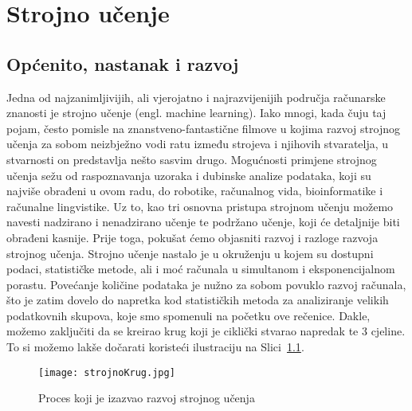 \documentclass[times, utf8, zavrsni, numeric]{fer}
\begin{document}
\chapter{Strojno učenje}
\section{Općenito, nastanak i razvoj}
Jedna od najzanimljivijih, ali vjerojatno i najrazvijenijih područja računarske znanosti je strojno učenje (engl. machine learning). Iako mnogi, kada čuju taj pojam, često pomisle na znanstveno-fantastične filmove u kojima razvoj strojnog učenja za sobom neizbježno vodi ratu između strojeva i njihovih stvaratelja, u stvarnosti on predstavlja nešto sasvim drugo. Mogućnosti primjene strojnog učenja sežu od raspoznavanja uzoraka i dubinske analize podataka, koji su najviše obrađeni u ovom radu, do robotike, računalnog vida, bioinformatike i računalne lingvistike. Uz to, kao tri osnovna pristupa strojnom učenju možemo navesti nadzirano i nenadzirano učenje te podržano učenje, koji će detaljnije biti obrađeni kasnije. Prije toga, pokušat ćemo objasniti razvoj i razloge razvoja strojnog učenja. Strojno učenje nastalo je u okruženju u kojem su dostupni podaci, statističke metode, ali i moć računala u simultanom i eksponencijalnom porastu. Povećanje količine podataka je nužno za sobom povuklo razvoj računala, što je zatim dovelo do napretka kod statističkih metoda za analiziranje velikih podatkovnih skupova, koje smo spomenuli na početku ove rečenice. Dakle, možemo zaključiti da se kreirao krug koji je ciklički stvarao napredak te 3 cjeline. To si možemo lakše dočarati koristeći ilustraciju na Slici~\ref{fig:strojnokrug}.

\begin{figure}[H]
\centering
\texttt{[image: strojnoKrug.jpg]}
\caption{Proces koji je izazvao razvoj strojnog učenja\cite{ungar2002uvod}}
\label{fig:strojnokrug}
\end{figure}
\end{document}
